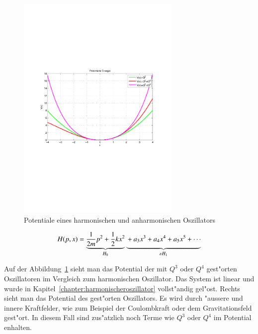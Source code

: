 \begin{refsection}
\begin{figure}	%
\centering
\includegraphics[width=0.7\textwidth]{anharmonisch/images/Potential.pdf}
\caption{Potentiale eines harmonischen und anharmonischen Oszillators
\label{skript:Potentiale}}
\end{figure}

\[
H(p,x)
=
\underbrace{\frac1{2m}p^2+\frac12 kx^2}_{H_0}
\underbrace{\vphantom{\frac1{2m}p^2+\frac12 kx^2}
+a_3 x^3+a_4 x^4+a_5 x^5+\dotsb}_{\varepsilon H_1}
\]

Auf der Abbildung~\ref{skript:Potentiale} sieht man das Potential der mit
$Q^3$ oder $Q^4$ gest"orten Oszillatoren im Vergleich zum harmonischen Oszillator.
Das System ist linear und wurde in
Kapitel~\ref{chapter:harmonischeroszillator} vollst"andig gel"ost.
Rechts sieht man das Potential des gest"orten Oszillators.
Es wird durch "aussere und innere Kraftfelder,
wie zum Beispiel der Coulombkraft oder dem Gravitationsfeld gest"ort.
In diesem Fall sind zus"atzlich noch Terme wie $Q^3$ oder $Q^4$ im Potential enhalten.


\end{refsection}
